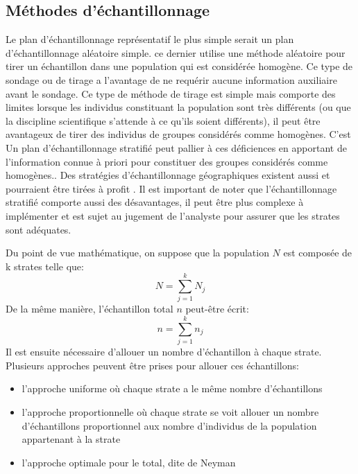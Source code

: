         \subsection{Méthodes d'échantillonnage}
            Le plan d'échantillonnage représentatif le plus simple serait un plan d'échantillonnage aléatoire simple\parencite{tille_theorie_2019}. ce dernier utilise une méthode aléatoire pour tirer un échantillon dans une population qui est considérée homogène. Ce type de sondage ou de tirage a l'avantage de ne requérir aucune information auxiliaire avant le sondage. Ce type de méthode de tirage est simple mais comporte des limites lorsque les individus constituant la population sont très différents (ou que la discipline scientifique s'attende à ce qu'ils soient différents), il peut être avantageux de tirer des individus de groupes considérés comme homogènes. C'est  
            Un plan d'échantillonnage stratifié peut pallier à ces déficiences en apportant de l'information connue à priori pour constituer des groupes considérés comme homogènes.\parencite{gumuchian_initiation_2000,tille_theorie_2019,cochran_sampling_1963}. Des stratégies d'échantillonnage géographiques existent aussi et pourraient être tirées à profit \parencite{gumuchian_initiation_2000}. Il est important de noter que l'échantillonnage stratifié comporte aussi des désavantages, il peut être plus complexe à implémenter et est sujet au jugement de l'analyste pour assurer que les strates sont adéquates.\par
            Du point de vue mathématique, on suppose que la population $N$ est composée de k strates telle que:
            \begin{equation}
                N = \sum_{j=1}^k N_j
            \end{equation}
            De la même manière, l'échantillon total $n$ peut-être écrit: 
            \begin{equation}
                n= \sum_{j=1}^k n_j
            \end{equation}
            Il est ensuite nécessaire d'allouer un nombre d'échantillon à chaque strate. Plusieurs approches peuvent être prises pour allouer ces échantillons\parencite{tille_theorie_2019}: 
            \begin{itemize}
                \item l'approche uniforme où chaque strate a le même nombre d'échantillons
                \item l'approche proportionnelle où chaque strate se voit allouer un nombre d'échantillons proportionnel aux nombre d'individus de la population appartenant à la strate
                \item l'approche optimale pour le total, dite de Neyman
            \end{itemize}
